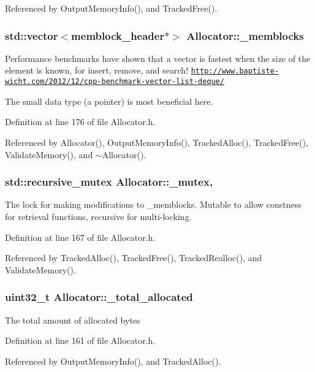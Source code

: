 Referenced by Output\-Memory\-Info(), and Tracked\-Free().

\subsubsection[{\-\_\-memblocks}]{\setlength{\rightskip}{0pt plus 5cm}std\-::vector$<${\bf memblock\-\_\-header}$\ast$$>$ Allocator\-::\-\_\-memblocks\hspace{0.3cm}{\ttfamily [private]}}\label{class_allocator_a14b439fa46e392aca969b4c4cf99fd19}
Performance benchmarks have shown that a vector is fastest when the size of the element is known, for insert, remove, and search! \href{http://www.baptiste-wicht.com/2012/12/cpp-benchmark-vector-list-deque/}{\tt http\-://www.\-baptiste-\/wicht.\-com/2012/12/cpp-\/benchmark-\/vector-\/list-\/deque/}

The small data type (a pointer) is most beneficial here. 

Definition at line 176 of file Allocator.\-h.



Referenced by Allocator(), Output\-Memory\-Info(), Tracked\-Alloc(), Tracked\-Free(), Validate\-Memory(), and $\sim$\-Allocator().

\subsubsection[{\-\_\-mutex}]{\setlength{\rightskip}{0pt plus 5cm}std\-::recursive\-\_\-mutex Allocator\-::\-\_\-mutex\hspace{0.3cm}{\ttfamily [mutable]}, {\ttfamily [private]}}\label{class_allocator_aeb33ace056dd043efbec5ea4115ae305}
The lock for making modifications to \-\_\-memblocks. Mutable to allow constness for retrieval functions, recursive for multi-\/locking. 

Definition at line 167 of file Allocator.\-h.



Referenced by Tracked\-Alloc(), Tracked\-Free(), Tracked\-Realloc(), and Validate\-Memory().

\subsubsection[{\-\_\-total\-\_\-allocated}]{\setlength{\rightskip}{0pt plus 5cm}uint32\-\_\-t Allocator\-::\-\_\-total\-\_\-allocated\hspace{0.3cm}{\ttfamily [private]}}\label{class_allocator_adaa40e36af99c1828a96f264ee405331}
The total amount of allocated bytes 

Definition at line 161 of file Allocator.\-h.



Referenced by Output\-Memory\-Info(), and Tracked\-Alloc().

